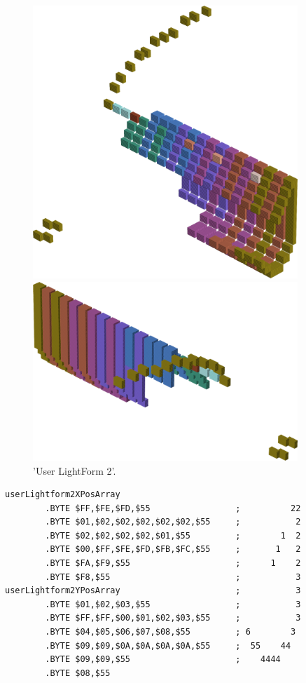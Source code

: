\begin{figure}[H]
    \centering
    \begin{adjustbox}{width=10cm,center}
      \includegraphics[width=10cm]{src/colorspace_patterns/pattern10-45.png}%
    \end{adjustbox}
    \begin{adjustbox}{width=10cm}
      \includegraphics[width=10cm]{src/colorspace_patterns/pattern10-225.png}%
    \end{adjustbox}
\caption{'User LightForm 2'.}
\end{figure}
\clearpage

\begin{lstlisting}
userLightform2XPosArray
        .BYTE $FF,$FE,$FD,$55                 ;          22
        .BYTE $01,$02,$02,$02,$02,$02,$55     ;           2
        .BYTE $02,$02,$02,$02,$01,$55         ;        1  2
        .BYTE $00,$FF,$FE,$FD,$FB,$FC,$55     ;       1   2
        .BYTE $FA,$F9,$55                     ;      1    2
        .BYTE $F8,$55                         ;           3
userLightform2YPosArray                       ;           3
        .BYTE $01,$02,$03,$55                 ;           3
        .BYTE $FF,$FF,$00,$01,$02,$03,$55     ;           3
        .BYTE $04,$05,$06,$07,$08,$55         ; 6        3 
        .BYTE $09,$09,$0A,$0A,$0A,$0A,$55     ;  55    44  
        .BYTE $09,$09,$55                     ;    4444    
        .BYTE $08,$55
\end{lstlisting}


